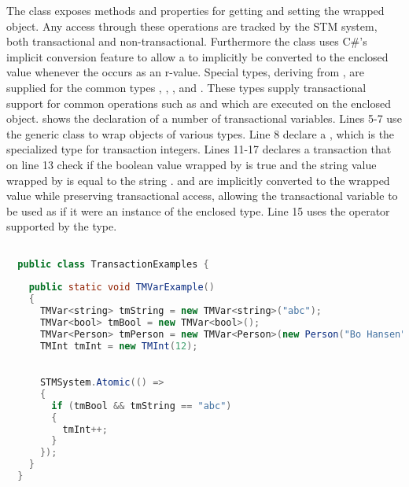 The  class exposes methods and properties for getting and setting the wrapped object. Any access through these operations are tracked by the \ac{STM} system, both transactional and non-transactional. Furthermore the  class uses C\#'s implicit conversion feature to allow a  to implicitly be converted to the enclosed value whenever the  occurs as an r-value. Special types, deriving from , are supplied for the common types , , ,   and . These types supply transactional support for common operations such as \bscode{++} and \bscode{--} which are executed on the enclosed object.   shows the declaration of a number of transactional variables. Lines 5-7 use the generic  class to wrap objects of various types. Line 8 declare a , which is the specialized type for transaction integers. Lines 11-17 declares a transaction that on line 13 check if the boolean value wrapped by  is true and the string value wrapped by  is equal to the string .  and  are implicitly converted to the wrapped value while preserving transactional access, allowing the transactional variable to be used as if it were an instance of the enclosed type. Line 15 uses the \bscode{++} operator supported by the  type.
\begin{lstlisting}[label=lst:library_tmvar,
  caption={Library Transactional Variable},
  language=Java,  
  showspaces=false,
  showtabs=false,
  breaklines=true,
  showstringspaces=false,
  breakatwhitespace=true,
  commentstyle=\color{greencomments},
  keywordstyle=\color{bluekeywords},
  stringstyle=\color{redstrings},
  morekeywords={atomic, retry, orElse, var, get, set, string, bool}]  % Start your code-block

  public class TransactionExamples {
      
    public static void TMVarExample()
    {
      TMVar<string> tmString = new TMVar<string>("abc");
      TMVar<bool> tmBool = new TMVar<bool>();
      TMVar<Person> tmPerson = new TMVar<Person>(new Person("Bo Hansen", 57));
      TMInt tmInt = new TMInt(12);
           

      STMSystem.Atomic(() =>
      {
        if (tmBool && tmString == "abc")
        {
          tmInt++;
        }
      });
    }
  }
\end{lstlisting}
